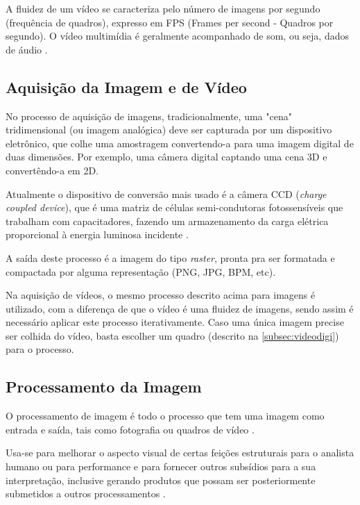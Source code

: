  A fluidez de um vídeo se caracteriza pelo número de imagens por segundo (frequência de quadros), expresso em FPS (Frames per second - Quadros por segundo). O vídeo multimídia é geralmente acompanhado de som, ou seja, dados de áudio \cite{ccm_video_digi}.

\subsection{Aquisição da Imagem e de Vídeo}\label{subsec:aquisicao_video}

No processo de aquisição de imagens, tradicionalmente, uma "cena" tridimensional (ou imagem analógica) deve ser capturada por um dispositivo eletrônico, que colhe uma amostragem convertendo-a para uma imagem digital de duas dimensões. Por exemplo, uma câmera digital captando uma cena 3D e convertêndo-a em 2D.

Atualmente o dispositivo de conversão mais usado  é a câmera CCD (\textit{charge coupled device}), que é uma matriz de células semi-condutoras fotossensíveis que trabalham com capacitadores, fazendo um armazenamento da carga elétrica proporcional à energia luminosa incidente \cite{gonzalez_woods}.

A saída deste processo é a imagem do tipo \textit{raster}, pronta pra ser formatada e compactada por alguma representação (PNG, JPG, BPM, etc). 


Na aquisição de vídeos, o mesmo processo descrito acima para imagens é utilizado, com a diferença de que o vídeo é uma fluidez de imagens, sendo assim é necessário aplicar este processo iterativamente. Caso uma única imagem precise ser colhida do vídeo, basta escolher um quadro (descrito na \autoref{subsec:videodigi}) para o processo.

\subsection{Processamento da Imagem}\label{subsec:processamento}

O processamento de imagem é todo o processo que tem uma imagem como entrada e saída, tais como fotografia ou quadros de vídeo \cite{inpe_proc_img}. 

Usa-se para melhorar o aspecto visual de certas feições estruturais para o analista humano ou para performance e para fornecer outros subsídios para a sua interpretação, inclusive gerando produtos que possam ser posteriormente submetidos a outros processamentos \cite{inpe_proc_img}.

